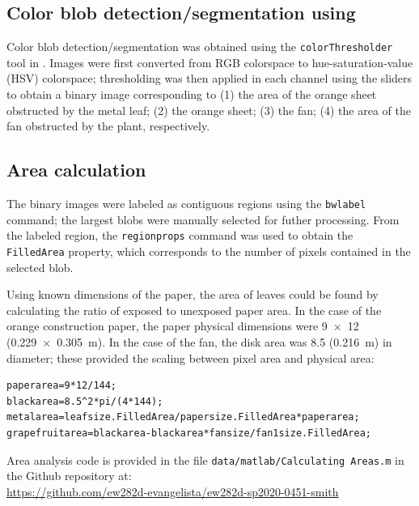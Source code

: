 \subsection{Color blob detection/segmentation using \Matlab}
Color blob detection/segmentation was obtained using the \lstinline{colorThresholder} tool in \Matlab. Images were first converted from RGB colorspace to hue-saturation-value (HSV) colorspace; thresholding was then applied in each channel using the sliders to obtain a binary image corresponding to (1) the area of the orange sheet obstructed by the metal leaf; (2) the orange sheet; (3) the fan; (4) the area of the fan obstructed by the plant, respectively. 

\subsection{Area calculation}
The binary images were labeled as contiguous regions using the \lstinline{bwlabel} command; the largest blobs were manually selected for futher processing. From the labeled region, the \lstinline{regionprops} command was used to obtain the \lstinline{FilledArea} property, which corresponds to the number of pixels contained in the selected blob. 

Using known dimensions of the paper, the area of leaves could be found by calculating the ratio of exposed to unexposed paper area. In the case of the orange construction paper, the paper physical dimensions were \SI{9x12}{\inch} (\SI{0.229x0.305}{\meter}). In the case of the fan, the disk area was \SI{8.5}{\inch} (\SI{0.216}{\meter}) in diameter; these provided the scaling between pixel area and physical area:
\begin{lstlisting}
paperarea=9*12/144;
blackarea=8.5^2*pi/(4*144);
metalarea=leafsize.FilledArea/papersize.FilledArea*paperarea;
grapefruitarea=blackarea-blackarea*fansize/fan1size.FilledArea;
\end{lstlisting}

Area analysis code is provided in the file \lstinline{data/matlab/Calculating Areas.m} in the Github repository at:\\ \url{https://github.com/ew282d-evangelista/ew282d-sp2020-0451-smith} 



